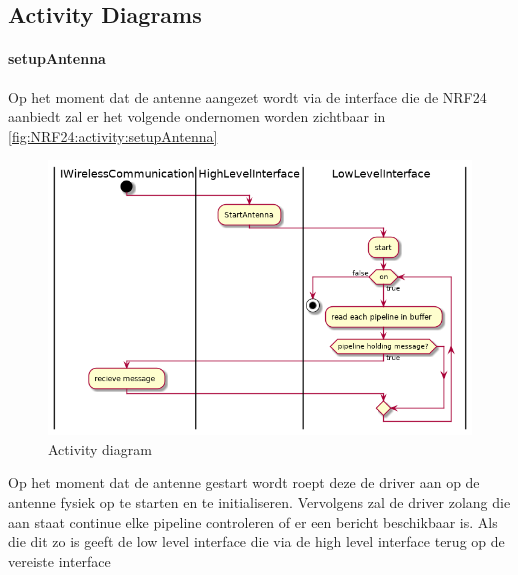 \documentclass[a4paper, 11pt, oneside]{report}
\begin{document}
\subsection{Activity Diagrams}
\label{DetailedDesign:NRF24:activity}

\paragraph{setupAntenna}
\label{DetailedDesign:NRF24:activity:setupAntenna}
Op het moment dat de antenne aangezet wordt via de interface die de NRF24 aanbiedt zal er het volgende ondernomen worden zichtbaar in \autoref{fig:NRF24:activity:setupAntenna}
\begin{figure}[H]
	\begin{center}\includegraphics[width=.9\linewidth]{UML/out/NRF24/activity/setupAntenna/setupAntenna.png}\end{center}
	\caption{Activity diagram }
	\label{fig:NRF24:activity:setupAntenna}
\end{figure}
Op het moment dat de antenne gestart wordt roept deze de driver aan op de antenne fysiek op te starten en te initialiseren.
Vervolgens zal de driver zolang die aan staat continue elke pipeline controleren of er een bericht beschikbaar is. 
Als die dit zo is geeft de low level interface die via de high level interface terug op de vereiste interface  
\end{document}
